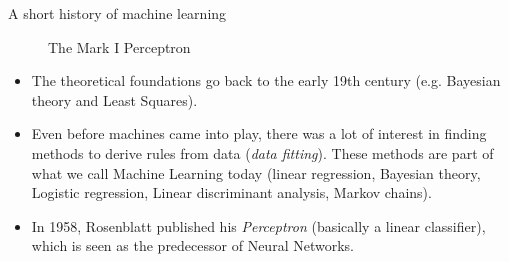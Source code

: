 \documentclass[xcolor=pdftex,dvipsnames,table]{beamer}
\begin{document}
\begin{frame}{A short history of machine learning}
\begin{figure}[htb]
  \centering
  \hspace{2cm}
  \caption{The Mark I Perceptron}
\end{figure}
\vspace{-.5cm}
\begin{itemize}
	\item The theoretical foundations go back to the early 19th century (e.g. Bayesian theory and Least Squares).
	\item Even before machines came into play, there was a lot of interest in finding methods to derive rules from data (\emph{data fitting}). These methods are part of what we call Machine Learning today (linear regression, Bayesian theory, Logistic regression, Linear discriminant analysis, Markov chains).
	\item In 1958, Rosenblatt published his \emph{Perceptron} (basically a linear classifier), which is seen as the predecessor of Neural Networks.
\end{itemize}
\end{frame}
\end{document}
